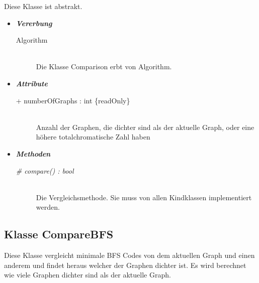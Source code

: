 \documentclass[13pt]{scrreprt}
\begin{document}
Diese Klasse ist abstrakt. 

\begin{itemize} [label = {$\circ$}]
	\item {\large \textbf{\textit{Vererbung}}\par}
	\begin{description}
		\item[Algorithm] \hfill \\Die Klasse Comparison erbt von Algorithm.
	\end{description}
	\item {\large \textbf{\textit{Attribute}}\par}
	\begin{description}
		\item [+ numberOfGraphs : int \{readOnly\}] \hfill \\Anzahl der Graphen, die dichter sind als der aktuelle Graph, oder eine höhere totalchromatische Zahl haben
	\end{description}
	\item {\large \textbf{\textit{Methoden}}\par}
	\begin{description}
		\item [\textit{\# compare() : bool}] \hfill \\Die Vergleichsmethode. Sie muss von allen Kindklassen implementiert werden.
	\end{description}
\end{itemize}

\subsection{Klasse CompareBFS}

Diese Klasse vergleicht minimale BFS Codes von dem aktuellen Graph und einen anderem und findet heraus welcher der Graphen dichter ist. Es wird berechnet wie viele Graphen dichter sind als der aktuelle Graph.
\end{document}
